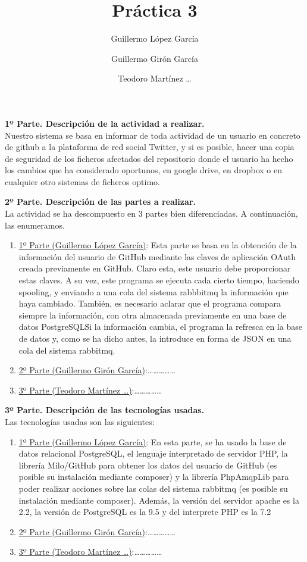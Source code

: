 \documentclass{article}
\title{Práctica 3}
\author{
Guillermo López García
\and
Guillermo Girón García
\and
Teodoro Martínez \ldots
}
\begin{document}
\maketitle
\textbf{1º Parte. Descripción de la actividad a realizar.}\\
Nuestro sistema se basa en informar de toda actividad de un usuario
en concreto de github a la plataforma de red social Twitter, y si es
posible, hacer una copia de seguridad de los ficheros afectados
del repositorio donde el usuario ha hecho los cambios que ha considerado
oportunos, en google drive, en dropbox o en cualquier otro sistemas
de ficheros optimo.

\textbf{2º Parte. Descripción de las partes a realizar.}\\
La actividad se ha descompuesto en 3 partes bien diferenciadas.
A continuación, las enumeramos.
\begin{enumerate}
    \item \underline{1º Parte (Guillermo López García)}: Esta parte se
        basa en la obtención de la información del usuario de GitHub mediante
        las claves de aplicación OAuth creada previamente en GitHub.
        Claro esta, este usuario debe proporcionar estas claves.
        A su vez, este programa se ejecuta cada cierto tiempo, haciendo spooling,
        y enviando a una cola del sistema rabbbitmq la información que haya cambiado.
        También, es necesario aclarar que el programa compara siempre la información,
        con otra almacenada previamente en una base de datos PostgreSQL\. Si la
        información cambia, el programa la refresca en la base de datos y, como se
        ha dicho antes, la introduce en forma de JSON en una cola del sistema
        rabbitmq.
    \item \underline{2º Parte (Guillermo Girón García)}:\ldots\ldots\ldots\ldots\ldots
    \item \underline{3º Parte (Teodoro Martínez \ldots)}:\ldots\ldots\ldots\ldots\ldots
\end{enumerate}

\textbf{3º Parte. Descripción de las tecnologías usadas.}\\
Las tecnologías usadas son las siguientes:
\begin{enumerate}
    \item \underline{1º Parte (Guillermo López García)}: En esta parte, se ha usado
        la base de datos relacional PostgreSQL, el lenguaje interpretado de servidor
        PHP, la librería Milo/GitHub para obtener los datos del usuario de GitHub
        (es posible su instalación mediante composer) y la librería PhpAmqpLib para
        poder realizar acciones sobre las colas del sistema rabbitmq (es posible su
        instalación mediante composer). Además, la versión del servidor apache es la
        2.2, la versión de PostgreSQL es la 9.5 y del interprete PHP es la 7.2
    \item \underline{2º Parte (Guillermo Girón García)}:\ldots\ldots\ldots\ldots\ldots
    \item \underline{3º Parte (Teodoro Martínez \ldots)}:\ldots\ldots\ldots\ldots\ldots
\end{enumerate}
\end{document}

